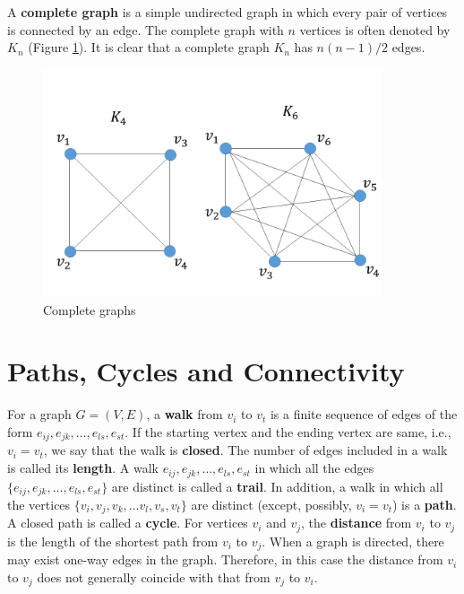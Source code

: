 \documentclass[10.5pt, A4paper, openany, uplatex]{book}
\numberwithin{equation}{section}
\begin{document}
\begin{appendices}
	A \textbf{complete graph} is a simple undirected graph in which every pair of vertices is connected by an edge.
	The complete graph with $n$ vertices is often denoted by $K_n$ (Figure \ref{fig:complete}). 
	It is clear that a complete graph $K_n$ has $n(n-1)/2$ edges.
	
	\begin{figure}[h!]
		\begin{center}
			\includegraphics[width = 10cm]{complete.png}
			\caption{Complete graphs\label{fig:complete}}
		\end{center}
	\end{figure}
	
	\section{Paths, Cycles and Connectivity}
	
	For a graph $G = (V, E)$, a \textbf{walk} from $v_i$ to $v_t$ is a finite sequence of edges of the form $e_{ij}, e_{jk}, \ldots , e_{ls}, e_{st}$.
	If the starting vertex and the ending vertex are same, i.e., $v_i = v_t$, we say that the walk is \textbf{closed}.
	The number of edges included in a walk is called its \textbf{length}.
	A walk $e_{ij}, e_{jk}, \ldots , e_{ls}, e_{st}$ in which all the edges $\{e_{ij}, e_{jk}, \ldots , e_{ls}, e_{st}\}$ are distinct is called a \textbf{trail}.
	In addition, a walk in which all the vertices $\{v_i, v_j, v_k, \ldots v_l, v_s, v_t\}$ are distinct (except, possibly, $v_i = v_t$) is a \textbf{path}.
	A closed path is called a \textbf{cycle}.
	For vertices $v_i$ and $v_j$, the \textbf{distance} from $v_i$ to $v_j$ is the length of the shortest path from $v_i$ to $v_j$.
	When a graph is directed, there may exist one-way edges in the graph.
	Therefore, in this case the distance from $v_i$ to $v_j$ does not generally coincide with that from $v_j$ to $v_i$.
	\bigskip
	

\end{appendices}
\end{document}
